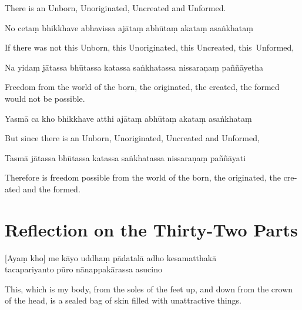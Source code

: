 \begin{english}
  There is an Unborn, Unoriginated, Uncreated and Unformed.
\end{english}

No cetaṃ bhikkhave abhavissa ajātaṃ abhūtaṃ akataṃ asaṅkhataṃ

\begin{english}
  If there was not this Unborn, this Unoriginated, this Uncreated, this~Unformed,
\end{english}

Na yidaṃ jātassa bhūtassa katassa saṅkhatassa nissaraṇaṃ paññāyetha

\begin{english}
  Freedom from the world of the born, the originated, the created, the formed would not be possible.
\end{english}

Yasmā ca kho bhikkhave atthi ajātaṃ abhūtaṃ akataṃ asaṅkhataṃ

\begin{english}
  But since there is an Unborn, Unoriginated, Uncreated and Unformed,
\end{english}

Tasmā jātassa bhūtassa katassa saṅkhatassa nissaraṇaṃ paññāyati

\begin{english}
  Therefore is freedom possible from the world of the born, the originated, the created and the formed.
\end{english}


\section{Reflection on the Thirty-Two Parts}

\begin{leader}
\end{leader}


[Ayaṃ kho] me kāyo uddhaṃ pādatalā adho kesamatthakā\\
tacapariyanto pūro nānappakārassa asucino

\begin{english}
  This, which is my body, from the soles of the feet up, and down from the crown of the head, is a sealed bag of skin filled with unattractive things.
\end{english}

